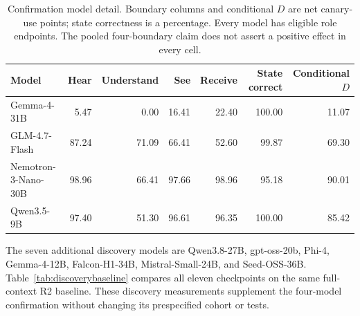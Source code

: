 \begin{table}[t]
\centering\small
\begin{lrbox}{\OCtable}\begin{tabular}{@{}lrrrrrr@{}}
\toprule
Model & Hear & Understand & See & Receive & State correct & Conditional $D$\\
\midrule
Gemma-4-31B & 5.47 & 0.00 & 16.41 & 22.40 & 100.00 & 11.07\\
GLM-4.7-Flash & 87.24 & 71.09 & 66.41 & 52.60 & 99.87 & 69.30\\
Nemotron-3-Nano-30B & 98.96 & 66.41 & 97.66 & 98.96 & 95.18 & 90.01\\
Qwen3.5-9B & 97.40 & 51.30 & 96.61 & 96.35 & 100.00 & 85.42\\
\bottomrule
\end{tabular}\end{lrbox}
\ifdim\wd\OCtable>\linewidth\PackageError{access-paper}{Table tab:modeldetail exceeds its column}{Revise the table layout.}\fi
\usebox{\OCtable}
\caption{Confirmation model detail. Boundary columns and conditional $D$ are net canary-use points; state correctness is a percentage. Every model has eligible role endpoints. The pooled four-boundary claim does not assert a positive effect in every cell.}
\label{tab:modeldetail}
\end{table}

The seven additional discovery models are Qwen3.8-27B, gpt-oss-20b, Phi-4, Gemma-4-12B, Falcon-H1-34B, Mistral-Small-24B, and Seed-OSS-36B. Table~\ref{tab:discoverybaseline} compares all eleven checkpoints on the same full-context R2 baseline. These discovery measurements supplement the four-model confirmation without changing its prespecified cohort or tests.

